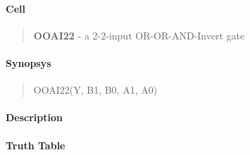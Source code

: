 \label{OOAI22}
\paragraph{Cell}
\begin{quote}
    \textbf{OOAI22} - a 2-2-input OR-OR-AND-Invert gate
\end{quote}

\paragraph{Synopsys}
\begin{quote}
    OOAI22(Y, B1, B0, A1, A0)
\end{quote}

\paragraph{Description}



\paragraph{Truth Table}


